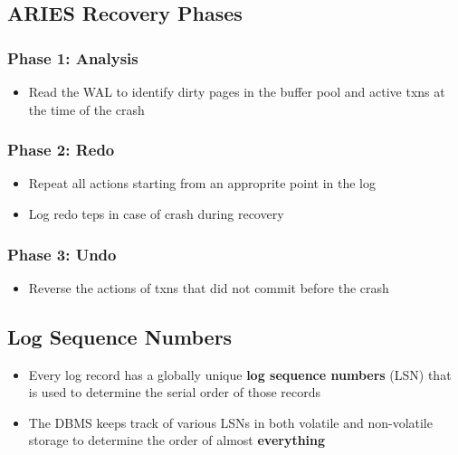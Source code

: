 \documentclass[11pt]{article}
\begin{document}
    \subsection*{ARIES Recovery Phases}
        \subsubsection*{Phase 1: Analysis}
        \begin{itemize}
            \item Read the WAL to identify dirty pages in the buffer pool and active txns at the time of the crash
        \end{itemize}
        \subsubsection*{Phase 2: Redo}
        \begin{itemize}
            \item Repeat all actions starting from an approprite point in the log
            \item Log redo teps in case of crash during recovery
        \end{itemize}
        \subsubsection*{Phase 3: Undo}
        \begin{itemize}
            \item Reverse the actions of txns that did not commit before the crash
        \end{itemize}

    \subsection*{Log Sequence Numbers}
    \begin{itemize}
        \item Every log record has a globally unique \textbf{log sequence numbers} (LSN) that is used to determine the serial order of those records
        \item The DBMS keeps track of various LSNs in both volatile and non-volatile storage to determine the order of almost \textbf{everything}
    \end{itemize}
\end{document}
